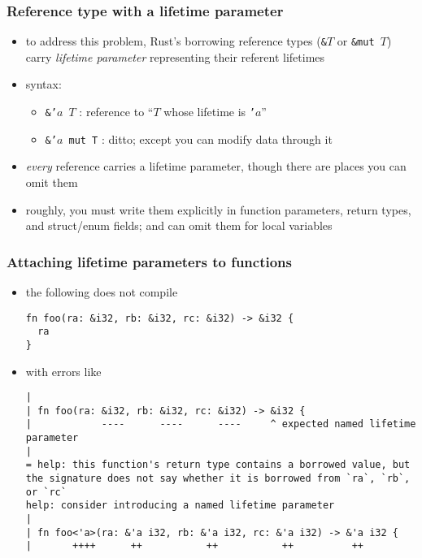 \documentclass[12pt,dvipdfmx]{beamer}
\newcommand{\ao}[1]{{\color{blue}#1}}
\begin{document}
\begin{frame}
  \frametitle{Reference type with a lifetime parameter}
  \begin{itemize}
  \item to address this problem,
    Rust's borrowing reference types (\ao{\tt \&$T$} or \ao{\tt \&mut $T$})
    carry \ao{\it lifetime parameter} representing their referent lifetimes
  \item syntax:
    \begin{itemize}
    \item \ao{\tt \&'$a$ $T$} : reference to ``$T$ whose lifetime is {\tt '$a$}''
    \item \ao{\tt \&'$a$ mut T} : ditto; except you can modify data through it
    \end{itemize}
\begin{center}
%
%
\end{center}

\item {\it every} reference carries a lifetime parameter,
  though there are places you can omit them
\item roughly, you must write them explicitly in function parameters,
  return types, and struct/enum fields; and can omit them for local variables
\end{itemize}
\end{frame}

\begin{frame}[fragile]
  \frametitle{Attaching lifetime parameters to functions}
  \begin{itemize}
  \item the following does not compile
\begin{lstlisting}
fn foo(ra: &i32, rb: &i32, rc: &i32) -> &i32 {
  ra
}
\end{lstlisting}
\item with errors like

\begin{lstlisting}[basicstyle=\ttfamily\tiny]
|
| fn foo(ra: &i32, rb: &i32, rc: &i32) -> &i32 {
|            ----      ----      ----     ^ expected named lifetime parameter
|
= help: this function's return type contains a borrowed value, but the signature does not say whether it is borrowed from `ra`, `rb`, or `rc`
help: consider introducing a named lifetime parameter
|
| fn foo<'a>(ra: &'a i32, rb: &'a i32, rc: &'a i32) -> &'a i32 {
|       ++++      ++           ++           ++          ++
\end{lstlisting}
  \end{itemize}
\end{frame}
\end{document}
